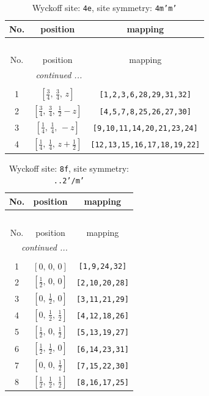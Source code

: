 \documentclass[fleqn,8pt]{jsarticle}
\begin{document}
\renewcommand{\arraystretch}{1.2}
\begin{longtable}{ccc}
\caption{Wyckoff site: {\tt 4e}, site symmetry: {\tt 4m'm'}}
 \\
 \hline \hline
No. & position & mapping \\ \hline \endfirsthead

\multicolumn{2}{l}{\tablename\ \thetable{}} \\
 \hline \hline
No. & position & mapping \\ \hline \endhead

 \hline \hline
\multicolumn{2}{r}{\footnotesize\it continued ...} \\ \endfoot

 \hline \hline
\multicolumn{2}{r}{} \\ \endlastfoot

1 & $\left[ \frac{3}{4},\, \frac{3}{4},\, z \right]$ & {\tt [1,2,3,6,28,29,31,32]} \\ \hline
2 & $\left[ \frac{3}{4},\, \frac{3}{4},\, \frac{1}{2} - z \right]$ & {\tt [4,5,7,8,25,26,27,30]} \\ \hline
3 & $\left[ \frac{1}{4},\, \frac{1}{4},\, - z \right]$ & {\tt [9,10,11,14,20,21,23,24]} \\ \hline
4 & $\left[ \frac{1}{4},\, \frac{1}{4},\, z + \frac{1}{2} \right]$ & {\tt [12,13,15,16,17,18,19,22]} \\
\end{longtable}
\renewcommand{\arraystretch}{1.2}
\begin{longtable}{ccc}
\caption{Wyckoff site: {\tt 8f}, site symmetry: {\tt ..2'/m'}}
 \\
 \hline \hline
No. & position & mapping \\ \hline \endfirsthead

\multicolumn{2}{l}{\tablename\ \thetable{}} \\
 \hline \hline
No. & position & mapping \\ \hline \endhead

 \hline \hline
\multicolumn{2}{r}{\footnotesize\it continued ...} \\ \endfoot

 \hline \hline
\multicolumn{2}{r}{} \\ \endlastfoot

1 & $\left[ 0,\, 0,\, 0 \right]$ & {\tt [1,9,24,32]} \\ \hline
2 & $\left[ \frac{1}{2},\, 0,\, 0 \right]$ & {\tt [2,10,20,28]} \\ \hline
3 & $\left[ 0,\, \frac{1}{2},\, 0 \right]$ & {\tt [3,11,21,29]} \\ \hline
4 & $\left[ 0,\, \frac{1}{2},\, \frac{1}{2} \right]$ & {\tt [4,12,18,26]} \\ \hline
5 & $\left[ \frac{1}{2},\, 0,\, \frac{1}{2} \right]$ & {\tt [5,13,19,27]} \\ \hline
6 & $\left[ \frac{1}{2},\, \frac{1}{2},\, 0 \right]$ & {\tt [6,14,23,31]} \\ \hline
7 & $\left[ 0,\, 0,\, \frac{1}{2} \right]$ & {\tt [7,15,22,30]} \\ \hline
8 & $\left[ \frac{1}{2},\, \frac{1}{2},\, \frac{1}{2} \right]$ & {\tt [8,16,17,25]} \\
\end{longtable}
\end{document}
